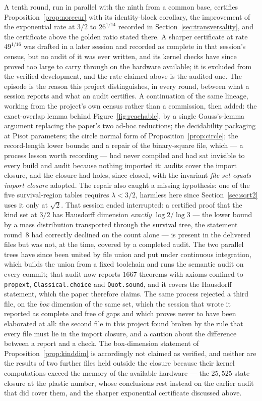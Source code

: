 \documentclass[11pt,reqno]{amsart}
\theoremstyle{plain}
\theoremstyle{definition}
\theoremstyle{remark}
\begin{document}
A tenth round, run in parallel with the ninth from a common base, certifies
Proposition~\ref{prop:norecur} with its identity-block corollary, the
improvement of the exponential rate at $3/2$ to $26^{1/14}$ recorded in
Section~\ref{sec:transversality}, and the certificate above the golden ratio
stated there. A sharper certificate at rate $49^{1/16}$ was drafted in a later
session and recorded as complete in that session's census, but no audit of it
was ever written, and its kernel checks have since proved too large to carry
through on the hardware available; it is excluded from the verified
development, and the rate claimed above is the audited one. The episode is
the reason this project distinguishes, in every round, between what a session
reports and what an audit certifies. A continuation of the same lineage, working from the project's
own census rather than a commission, then added: the exact-overlap lemma
behind Figure~\ref{fig:reachable}, by a single Gauss's-lemma argument
replacing the paper's two ad-hoc reductions; the decidability packaging at
Pisot parameters; the circle normal form of Proposition~\ref{prop:circle};
the record-length lower bounds; and a repair of the binary-square file, which
--- a process lesson worth recording --- had never compiled and had sat
invisible to every build and audit because nothing imported it: audits cover
the import closure, and the closure had holes, since closed, with the
invariant \emph{file set equals import closure} adopted. The repair also
caught a missing hypothesis: one of the five survival-region tables requires
$\lambda<3/2$, harmless here since Section~\ref{sec:sqrt2} uses it only at
$\sqrt2$. That session ended interrupted: a certified proof that the kind set
at $3/2$ has Hausdorff dimension \emph{exactly} $\log2/\log3$ --- the lower
bound by a mass distribution transported through the survival tree, the
statement round~$8$ had correctly declined on the count alone --- is present
in the delivered files but was not, at the time, covered by a completed audit.
The two parallel trees have since been united by file union and put under
continuous integration, which builds the union from a fixed toolchain and runs
the semantic audit on every commit; that audit now reports $1667$ theorems
with axioms confined to \texttt{propext}, \texttt{Classical.choice} and
\texttt{Quot.sound}, and it covers the Hausdorff statement, which the paper
therefore claims. The same process rejected a third file, on the \emph{box}
dimension of the same set, which the session that wrote it reported as
complete and free of gaps and which proves never to have been elaborated at
all: the second file in this project found broken by the rule that every file
must lie in the import closure, and a caution about the difference between a
report and a check. The box-dimension statement of
Proposition~\ref{prop:kinddim} is accordingly not claimed as verified, and
neither are the results of two further files held outside the closure because
their kernel computations exceed the memory of the available hardware --- the
$25{,}525$-state closure at the plastic number, whose conclusions rest instead
on the earlier audit that did cover them, and the sharper exponential
certificate discussed above.
\end{document}
